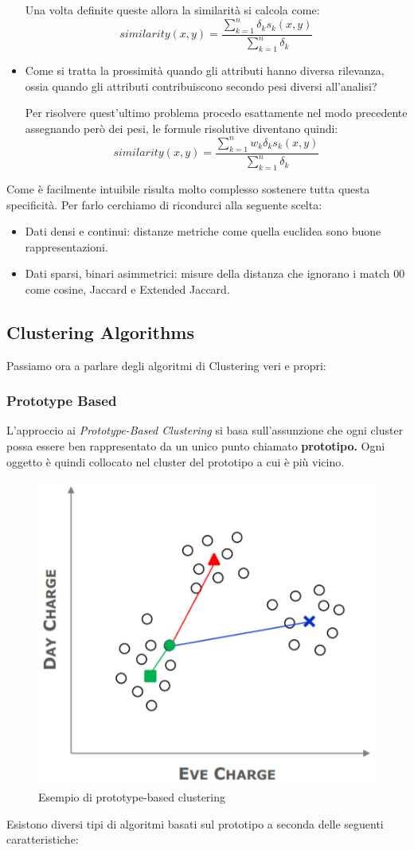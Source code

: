 \begin{itemize}
	Una volta definite queste allora la similarità si calcola come:
	\[similarity(x,y) = \frac{\sum_{k=1}^{n}\delta_{k}s_{k}(x,y)}{\sum_{k=1}^{n}\delta_{k}}\]
	\item Come si tratta la prossimità quando gli attributi hanno diversa rilevanza, ossia quando gli attributi contribuiscono secondo pesi diversi all'analisi? 
	
	Per risolvere quest'ultimo problema procedo esattamente nel modo precedente assegnando però dei pesi, le formule risolutive diventano quindi:
	\[similarity(x,y) = \frac{\sum_{k=1}^{n}w_{k}\delta_{k}s_{k}(x,y)}{\sum_{k=1}^{n}\delta_{k}}\]
\end{itemize}

Come è facilmente intuibile risulta molto complesso sostenere tutta questa specificità. Per farlo cerchiamo di ricondurci alla seguente scelta:
\begin{itemize}
	\item Dati densi e continui: distanze metriche  come quella euclidea sono buone rappresentazioni.
	\item Dati sparsi, binari asimmetrici: misure della distanza che ignorano i match 00 come cosine, Jaccard e Extended Jaccard.
\end{itemize}

\subsection{Clustering Algorithms}
Passiamo ora a parlare degli algoritmi di Clustering veri e propri:
\subsubsection{Prototype Based}

L'approccio ai  \textit{Prototype-Based Clustering} si basa sull'assunzione che ogni cluster possa essere ben rappresentato da un unico punto chiamato \textbf{prototipo.} Ogni oggetto è quindi collocato nel cluster del prototipo a cui è più vicino.

\begin{figure}[H]
	\centering
	\includegraphics[height=0.4 \linewidth]{clustering/pict/prototype_cluster.png}
	\caption{Esempio di prototype-based clustering}
\end{figure}
Esistono diversi tipi di algoritmi basati sul prototipo a seconda delle seguenti caratteristiche:

